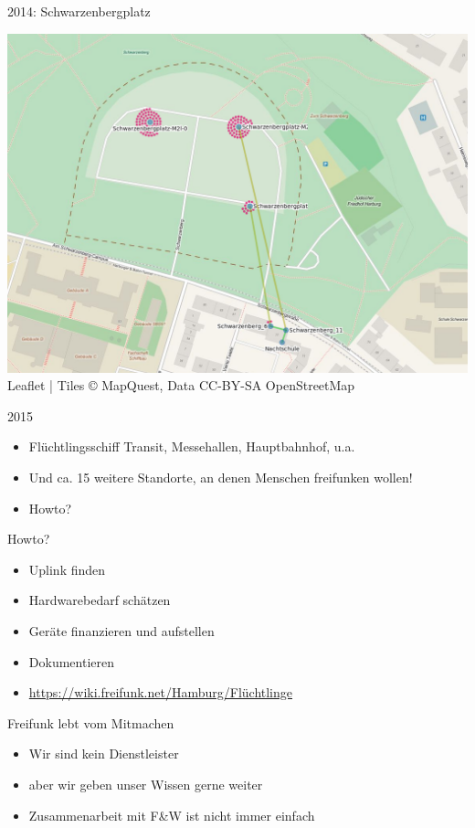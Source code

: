 \documentclass[t]{beamer}
\begin{document}
  \begin{frame}{2014: Schwarzenbergplatz}
    \begin{center}
      \includegraphics[width=.7\textwidth]{Bilder/schwarzenberg-2015-09-22}
      \newline\tiny{Leaflet | Tiles © MapQuest, Data CC-BY-SA OpenStreetMap}
    \end{center}
  \end{frame}
  
  \begin{frame}{2015}
    \begin{itemize}
      \item Flüchtlingsschiff Transit, Messehallen, Hauptbahnhof, u.a.
      \item Und ca. 15 weitere Standorte, an denen Menschen freifunken wollen!
      \item Howto?
    \end{itemize}
  \end{frame}
  
  \begin{frame}{Howto?}
    \begin{itemize}
      \item Uplink finden
      \item Hardwarebedarf schätzen
      \item Geräte finanzieren und aufstellen
      \item Dokumentieren
      \bigskip
      \item \small{ \href{https://wiki.freifunk.net/Hamburg/Flüchtlinge}{https://wiki.freifunk.net/Hamburg/Flüchtlinge}}
    \end{itemize}
  \end{frame}
  
  \begin{frame}{Freifunk lebt vom Mitmachen}
    \begin{itemize}
      \item Wir sind kein Dienstleister
      \item aber wir geben unser Wissen gerne weiter
    \end{itemize}
    \vspace{30pt}
    \begin{itemize}
      \item Zusammenarbeit mit F\&W ist nicht immer einfach
    \end{itemize}
  \end{frame}
  
\end{document}
